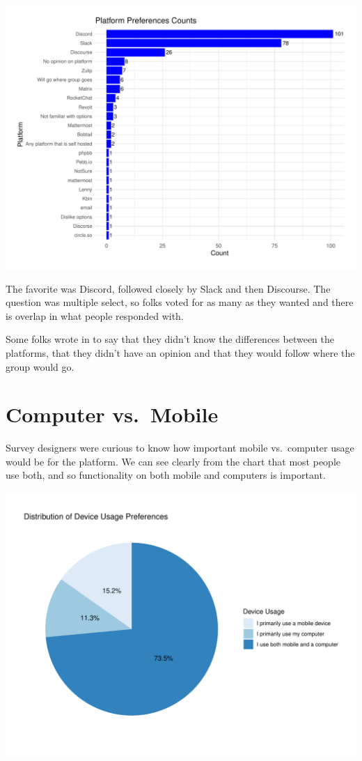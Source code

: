 \documentclass[
]{book}
\begin{document}
\includegraphics{XOXO_CommunitySurvey_2024_files/figure-latex/platform-barchart-1.pdf}

The favorite was Discord, followed closely by Slack and then Discourse. The question was multiple select, so folks voted for as many as they wanted and there is overlap in what people responded with.

Some folks wrote in to say that they didn't know the differences between the platforms, that they didn't have an opinion and that they would follow where the group would go.

\section{Computer vs.~Mobile}\label{computer-vs.-mobile}

Survey designers were curious to know how important mobile vs.~computer usage would be for the platform. We can see clearly from the chart that most people use both, and so functionality on both mobile and computers is important.

\includegraphics{XOXO_CommunitySurvey_2024_files/figure-latex/platform-piechart-1.pdf}
\end{document}
